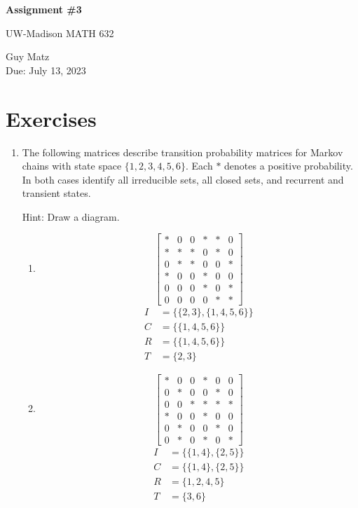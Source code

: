 \documentclass{article} %
\theoremstyle{plain}
\theoremstyle{case}
\begin{document}
\begin{center}
\Large{\textbf{Assignment \#3}
            
UW-Madison MATH 632} %
\vspace{5pt}
        
\normalsize{  Guy Matz%
        \\ Due: July 13, 2023}
\vspace{15pt}
\end{center}

\section*{Exercises}%
\begin{enumerate}[label={\fbox{\textbf{Exercise \#\arabic* :}}}]

  \item The following matrices describe transition probability matrices for Markov chains with state space $\{1,2,3,4,5,6\}$. Each $*$ denotes a positive probability. In both cases identify all irreducible sets, all closed sets, and recurrent and transient states.

Hint: Draw a diagram.

  \begin{enumerate}
  \item 
$$
\left[\begin{array}{llllll}
* & 0 & 0 & * & * & 0 \\
* & * & * & 0 & * & 0 \\
0 & * & * & 0 & 0 & * \\
* & 0 & 0 & * & 0 & 0 \\
0 & 0 & 0 & * & 0 & * \\
0 & 0 & 0 & 0 & * & *
\end{array}\right]
$$
  \begin{align*}
    I &= \{\{2,3\}, \{1,4,5,6\}\} \\
    C &= \{\{1,4,5,6\}\} \\
    R &= \{\{1,4,5,6\}\}  \\
    T &= \{2,3\} 
  \end{align*}

  \item 
$$
\left[\begin{array}{llllll}
* & 0 & 0 & * & 0 & 0 \\
0 & * & 0 & 0 & * & 0 \\
0 & 0 & * & * & * & * \\
* & 0 & 0 & * & 0 & 0 \\
0 & * & 0 & 0 & * & 0 \\
0 & * & 0 & * & 0 & *
\end{array}\right]
$$
  \begin{align*}
    I &= \{\{1,4\}, \{2,5\}\} \\
    C &= \{\{1,4\}, \{2,5\}\} \\
    R &= \{1,2,4,5\} \\
    T &= \{3,6\}
  \end{align*}
  \end{enumerate}


\end{enumerate}
\end{document}
